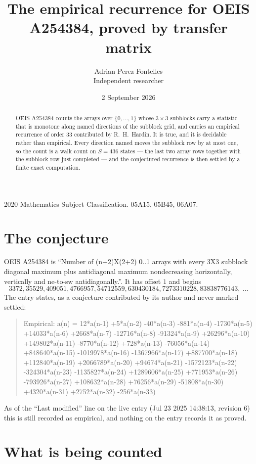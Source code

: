\documentclass[11pt,a4paper]{article}
\title{The empirical recurrence for OEIS A254384, proved by transfer matrix}
\author{Adrian Perez Fontelles\\ \small Independent researcher}
\date{2 September 2026}
\theoremstyle{plain}
\theoremstyle{definition}
\begin{document}
\maketitle

\begin{abstract}
OEIS A254384 counts the arrays over $\{0,\dots,1\}$ whose $3\times3$ subblocks carry a
statistic that is monotone along named directions of the subblock grid, and carries an
empirical recurrence of order $33$ contributed by R.~H.~Hardin. It is true, and it is
decidable rather than empirical. Every direction named moves the subblock row by at most one,
so the count is a walk count on $S=436$ states --- the last two array rows together with the
subblock row just completed --- and the conjectured recurrence is then settled by a finite
exact computation.
\end{abstract}

\noindent\small 2020 Mathematics Subject Classification. 05A15, 05B45, 06A07.\normalsize

\section{The conjecture}

OEIS A254384 is ``Number of (n+2)X(2+2) 0..1 arrays with every 3X3 subblock diagonal maximum plus antidiagonal maximum nondecreasing horizontally, vertically and ne-to-sw antidiagonally.''. It has offset $1$ and begins
\[
3372, 35529, 409051, 4766957, 54712559, 630430184, 7273310228, 83838776143,\ \dots
\]
The entry states, as a conjecture contributed by its author and never marked settled:
\begin{quote}
Empirical: a(n) = 12*a(n-1) +5*a(n-2) -40*a(n-3) -881*a(n-4) -1730*a(n-5) +14033*a(n-6) +2668*a(n-7) -12716*a(n-8) -91324*a(n-9) +26296*a(n-10) +149802*a(n-11) -8770*a(n-12) +728*a(n-13) -76056*a(n-14) +848640*a(n-15) -1019978*a(n-16) -1367966*a(n-17) +887700*a(n-18) +112840*a(n-19) +2066789*a(n-20) +94674*a(n-21) -1572123*a(n-22) -324304*a(n-23) -1135827*a(n-24) +1289606*a(n-25) +771953*a(n-26) -793926*a(n-27) +108632*a(n-28) +76256*a(n-29) -51808*a(n-30) +4320*a(n-31) +2752*a(n-32) -256*a(n-33)
\end{quote}
As of the ``Last modified'' line on the live entry (Jul 23 2025 14:38:13, revision 6) this is still
recorded as empirical, and nothing on the entry records it as proved.

\section{What is being counted}
\end{document}

